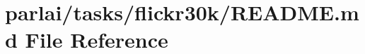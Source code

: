 \hypertarget{parlai_2tasks_2flickr30k_2README_8md}{}\section{parlai/tasks/flickr30k/\+R\+E\+A\+D\+ME.md File Reference}
\label{parlai_2tasks_2flickr30k_2README_8md}
